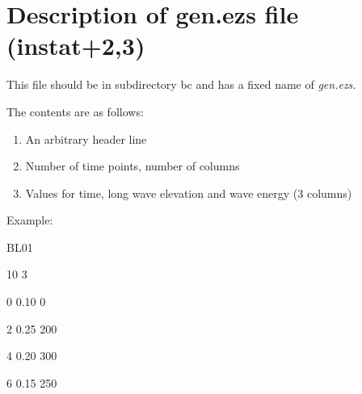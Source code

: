 \chapter{Description of gen.ezs file (instat+2,3)}

This file should be in subdirectory bc and has a fixed name of \textit{gen.ezs.}

The contents are as follows:

\begin{enumerate}
\item  An arbitrary header line

\item  Number of time points, number of columns

\item  Values for time, long wave elevation and wave energy (3 columns)
\end{enumerate}

Example:

BL01

10 3

0  0.10    0

2    0.25 200

4    0.20 300  

6    0.15  250 

